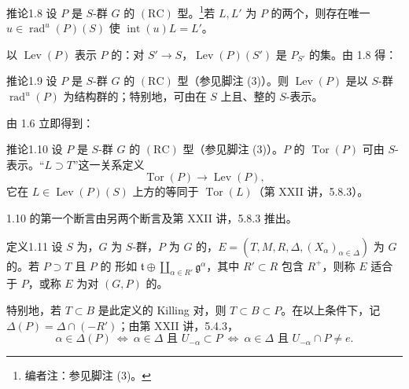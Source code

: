 \begin{SGAresult}{推论}{1.8}
设 $P$ 是 $S$-群 $G$ 的 $(\mathrm{RC})$ 型。\footnote{编者注：参见脚注 (3)。}若 $L,L'$ 为 $P$ 的两个，则存在唯一 $u\in\operatorname{rad}^{u}(P)(S)$ 使 $\operatorname{int}(u)L=L'$。
\end{SGAresult}
以 $\operatorname{Lev}(P)$ 表示 $P$ 的：对 $S'\to S$，$\operatorname{Lev}(P)(S')$ 是 $P_{S'}$ 的集。由 1.8 得：
\begin{SGAresult}{推论}{1.9}
设 $P$ 是 $S$-群 $G$ 的 $(\mathrm{RC})$ 型（参见脚注 (3)）。则 $\operatorname{Lev}(P)$ 是以 $S$-群 $\operatorname{rad}^{u}(P)$ 为结构群的；特别地，可由在 $S$ 上且、整的 $S$-表示。
\end{SGAresult}
由 1.6 立即得到：
\begin{SGAresult}{推论}{1.10}
设 $P$ 是 $S$-群 $G$ 的 $(\mathrm{RC})$ 型（参见脚注 (3)）。$P$ 的 $\operatorname{Tor}(P)$ 可由 $S$-表示。“$L\supset T$”这一关系定义
\[\operatorname{Tor}(P)\longrightarrow\operatorname{Lev}(P),\]
它在 $L\in\operatorname{Lev}(P)(S)$ 上方的等同于 $\operatorname{Tor}(L)$（第 XXII 讲，5.8.3）。
\end{SGAresult}
1.10 的第一个断言由另两个断言及第 XXII 讲，5.8.3 推出。
\begin{SGAresult}{定义}{1.11}
设 $S$ 为，$G$ 为 $S$-群，$P$ 为 $G$ 的，$E=(T,M,R,\Delta,(X_\alpha)_{\alpha\in\Delta})$ 为 $G$ 的。若 $P\supset T$ 且 $P$ 的 形如 $\mathfrak t\oplus\coprod_{\alpha\in R'}\mathfrak g^\alpha$，其中 $R'\subset R$ 包含 $R^+$，则称 $E$ 适合于 $P$，或称 $E$ 为对 $(G,P)$ 的。
\end{SGAresult}
特别地，若 $T\subset B$ 是此定义的 Killing 对，则 $T\subset B\subset P$。在以上条件下，记 $\Delta(P)=\Delta\cap(-R')$；由第 XXII 讲，5.4.3，
\[\alpha\in\Delta(P)\ \Longleftrightarrow\ \alpha\in\Delta\text{ 且 }U_{-\alpha}\subset P\ \Longleftrightarrow\ \alpha\in\Delta\text{ 且 }U_{-\alpha}\cap P\ne e.\]
